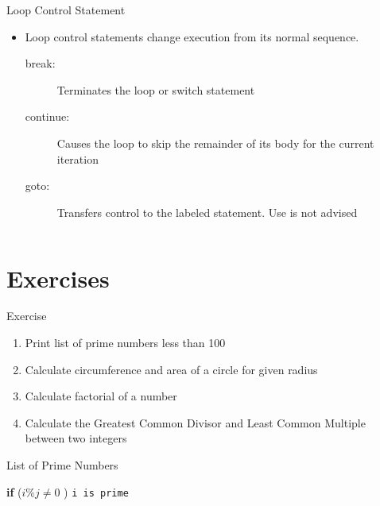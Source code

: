 \documentclass[10pt,t]{beamer}
\begin{document}
\begin{frame}[fragile]
  
\end{frame}

\begin{frame}[fragile]{Loop Control Statement}
  \begin{itemize}
    \item Loop control statements change execution from its normal sequence.
      \begin{description}
        \item[break:] Terminates the loop or switch statement
        \item[continue:] Causes the loop to skip the remainder of its body for the current iteration
        \item[goto:] Transfers control to the labeled statement. Use is not advised
      \end{description}
  \end{itemize}
  \begin{columns}
    
    
  \end{columns}
\end{frame}

\section{Exercises}
\begin{frame}{Exercise}
  \begin{enumerate}
    \item Print list of prime numbers less than 100
    \item Calculate circumference and area of a circle for given radius
    \item Calculate factorial of a number
    \item Calculate the Greatest Common Divisor and Least Common Multiple between two integers
  \end{enumerate}
\end{frame}

\begin{frame}{List of Prime Numbers}
  \begin{algorithm}[H]
    \caption{Pseudo code to get list of prime numbers}
    \begin{algorithmic}
        \State \textbf{if} ($i\%j \ne 0$ ) \texttt{i is prime}
        \EndFor
      \EndFor
    \end{algorithmic}
  \end{algorithm}
\end{frame}
\end{document}
